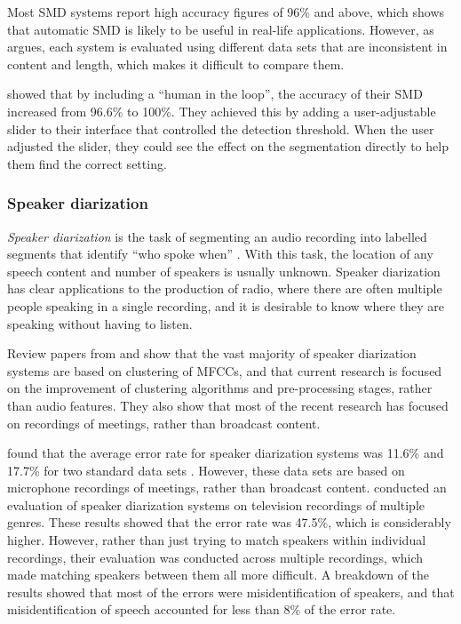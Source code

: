 Most SMD systems report high accuracy figures of 96\% and above, which shows that automatic SMD is likely to be useful
in real-life applications.  However, as \citet{Pikrakis2008} argues, each system is evaluated using different data sets
that are inconsistent in content and length, which makes it difficult to compare them.

\citet{Wieser2014} showed that by including a ``human in the loop'', the accuracy of their SMD increased from 96.6\% to
100\%. They achieved this by adding a user-adjustable slider to their interface that controlled the detection
threshold. When the user adjusted the slider, they could see the effect on the segmentation directly to help them find
the correct setting.

\subsubsection{Speaker diarization}\label{sec:background-diarization}
\textit{Speaker diarization} is the task of segmenting an audio recording into labelled segments that identify ``who
spoke when'' \citep{AngueraMiro2012}. With this task, the location of any speech content and number of speakers is
usually unknown. Speaker diarization has clear applications to the production of radio, where there are often multiple
people speaking in a single recording, and it is desirable to know where they are speaking without having to listen.

Review papers from \citet{Tranter2006} and \citet{AngueraMiro2012} show that the vast majority of speaker diarization
systems are based on clustering of MFCCs, and that current research is focused on the improvement of clustering
algorithms and pre-processing stages, rather than audio features. They also show that most of the recent research has
focused on recordings of meetings, rather than broadcast content.



\citet{AngueraMiro2012} found that the average error rate for speaker diarization systems was 11.6\% and 17.7\% for two
standard data sets \citep{NIST2016}. However, these data sets are based on microphone recordings of meetings, rather
than broadcast content.  \citet{Bell2015} conducted an evaluation of speaker diarization systems on television
recordings of multiple genres.  These results showed that the error rate was 47.5\%, which is considerably higher.
However, rather than just trying to match speakers within individual recordings, their evaluation was conducted across
multiple recordings, which made matching speakers between them all more difficult.  A breakdown of the results
showed that most of the errors were misidentification of speakers, and that misidentification of speech accounted for
less than 8\% of the error rate.

